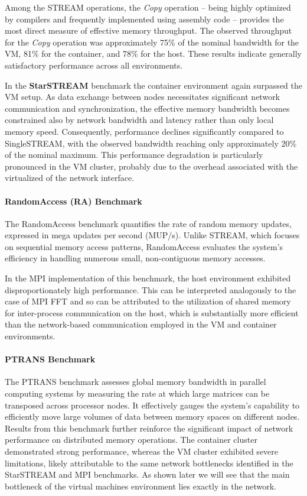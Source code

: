 Among the STREAM operations, the \textit{Copy} operation -- being highly optimized by compilers and frequently implemented using assembly code -- provides the most direct measure of effective memory throughput. The observed throughput for the \textit{Copy} operation was approximately 75\% of the nominal bandwidth for the VM, 81\% for the container, and 78\% for the host. These results indicate generally satisfactory performance across all environments.

In the \textbf{StarSTREAM} benchmark the container environment again surpassed the VM setup. As data exchange between nodes necessitates significant network communication and synchronization, the effective memory bandwidth becomes constrained also by network bandwidth and latency rather than only local memory speed. Consequently, performance declines significantly compared to SingleSTREAM, with the observed bandwidth reaching only approximately 20\% of the nominal maximum. This performance degradation is particularly pronounced in the VM cluster, probably due to the overhead associated with the virtualized of the network interface.


\paragraph{RandomAccess (RA) Benchmark}

The RandomAccess benchmark quantifies the rate of random memory updates, expressed in mega updates per second (MUP/s). Unlike STREAM, which focuses on sequential memory access patterns, RandomAccess evaluates the system's efficiency in handling numerous small, non-contiguous memory accesses. 

In the MPI implementation of this benchmark, the host environment exhibited disproportionately high performance. This can be interpreted analogously to the case of MPI FFT and so can be attributed to the utilization of shared memory for inter-process communication on the host, which is substantially more efficient than the network-based communication employed in the VM and container environments.

\paragraph{PTRANS Benchmark}

The PTRANS benchmark assesses global memory bandwidth in parallel computing systems by measuring the rate at which large matrices can be transposed across processor nodes. It effectively gauges the system's capability to efficiently move large volumes of data between memory spaces on different nodes. Results from this benchmark further reinforce the significant impact of network performance on distributed memory operations. The container cluster demonstrated strong performance, whereas the VM cluster exhibited severe limitations, likely attributable to the same network bottlenecks identified in the StarSTREAM and MPI benchmarks. As shown later we will see that the main bottleneck of the virtual machines environment lies exactly in the network.

